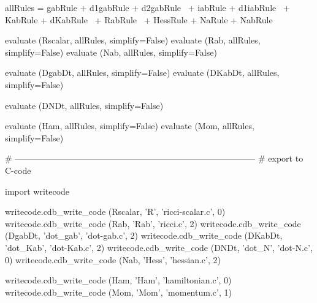 \documentclass[12pt]{cdblatex}
\begin{document}
\begin{cadabra}
   allRules =   gabRule + d1gabRule + d2gabRule \
              + iabRule + d1iabRule \
              + KabRule + dKabRule \
              + RabRule \
              + HessRule + NaRule + NabRule

   evaluate (Rscalar, allRules, simplify=False)
   evaluate (Rab,     allRules, simplify=False)
   evaluate (Nab,     allRules, simplify=False)

   evaluate (DgabDt,  allRules, simplify=False)
   evaluate (DKabDt,  allRules, simplify=False)

   evaluate (DNDt,    allRules, simplify=False)

   evaluate (Ham,     allRules, simplify=False)
   evaluate (Mom,     allRules, simplify=False)

   # ------------------------------------------------------------------------------------
   # export to C-code

   import writecode

   writecode.cdb_write_code (Rscalar, 'R',       'ricci-scalar.c', 0)
   writecode.cdb_write_code (Rab,     'Rab',     'ricci.c',        2)
   writecode.cdb_write_code (DgabDt,  'dot_gab', 'dot-gab.c',      2)
   writecode.cdb_write_code (DKabDt,  'dot_Kab', 'dot-Kab.c',      2)
   writecode.cdb_write_code (DNDt,    'dot_N',   'dot-N.c',        0)
   writecode.cdb_write_code (Nab,     'Hess',    'hessian.c',      2)

   writecode.cdb_write_code (Ham,     'Ham',     'hamiltonian.c',  0)
   writecode.cdb_write_code (Mom,     'Mom',     'momentum.c',     1)
\end{cadabra}
\end{document}
